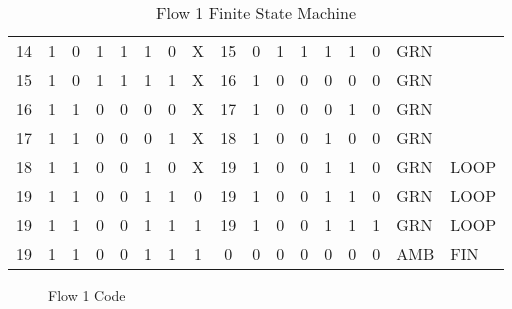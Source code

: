 \begin{table*}
\begin{tabularx}{\linewidth}{ c c c c c c c c | c c c c c c | c l l}
   14 &   1 &  0 &  1 &  1 &  1 &  0 & X      &  15 &  0 &  1 &  1 &  1 &  1             &   0 & GRN & \\
   15 &   1 &  0 &  1 &  1 &  1 &  1 & X      &  16 &  1 &  0 &  0 &  0 &  0             &   0 & GRN & \\
   16 &   1 &  1 &  0 &  0 &  0 &  0 & X      &  17 &  1 &  0 &  0 &  0 &  1             &   0 & GRN & \\
   17 &   1 &  1 &  0 &  0 &  0 &  1 & X      &  18 &  1 &  0 &  0 &  1 &  0             &   0 & GRN & \\
   18 &   1 &  1 &  0 &  0 &  1 &  0 & X      &  19 &  1 &  0 &  0 &  1 &  1             &   0 & GRN & LOOP \\
   19 &   1 &  1 &  0 &  0 &  1 &  1 & 0      &  19 &  1 &  0 &  0 &  1 &  1             &   0 & GRN & LOOP \\
   19 &   1 &  1 &  0 &  0 &  1 &  1 & 1      &  19 &  1 &  0 &  0 &  1 &  1             &   1 & GRN & LOOP \\
   19 &   1 &  1 &  0 &  0 &  1 &  1 & 1      &   0 &  0 &  0 &  0 &  0 &  0             &   0 & AMB & FIN
\end{tabularx}
\caption{Flow 1 Finite State Machine}
\label{tab:F1sm}
\end{table*}

\begin{figure*}

\caption{Flow 1 Code}
\label{lst:F1}
\end{figure*}



